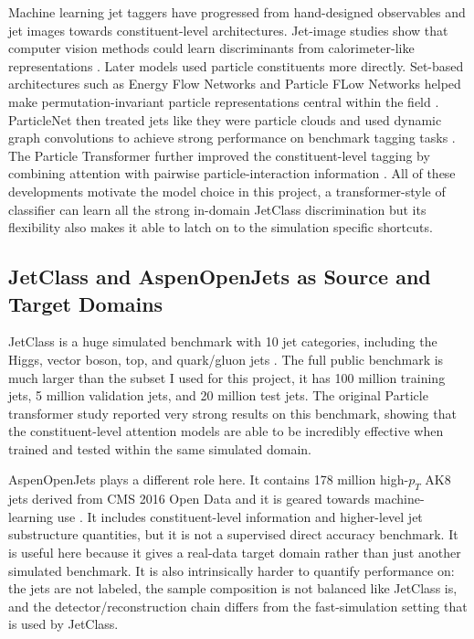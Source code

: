 \documentclass[11pt]{article}
\begin{document}
Machine learning jet taggers have progressed from hand-designed observables and jet images towards constituent-level architectures. Jet-image studies show that computer vision methods could learn discriminants from calorimeter-like representations \cite{cogan2015jetimages,deoliveira2016jetimages}. Later models used particle constituents more directly. Set-based architectures such as Energy Flow Networks and Particle FLow Networks helped make permutation-invariant particle representations central within the field \cite{komiske2019energy}. ParticleNet then treated jets like they were particle clouds and used dynamic graph convolutions to achieve strong performance on benchmark tagging tasks \cite{qu2020particlenet}. The Particle Transformer further improved the constituent-level tagging by combining attention with pairwise particle-interaction information \cite{qu2022particle}. All of these developments motivate the model choice in this project, a transformer-style of classifier can learn all the strong in-domain JetClass discrimination but its flexibility also makes it able to latch on to the simulation specific shortcuts.


\subsection{JetClass and AspenOpenJets as Source and Target Domains}

JetClass is a huge simulated benchmark with 10 jet categories, including the Higgs, vector boson, top, and quark/gluon jets \cite{qu2022particle}. The full public benchmark is much larger than the subset I used for this project, it has 100 million training jets, 5 million validation jets, and 20 million test jets. The original Particle transformer study reported very strong results on this benchmark, showing that the constituent-level attention models are able to be incredibly effective when trained and tested within the same simulated domain.

AspenOpenJets plays a different role here. It contains 178 million  high-$p_T$ AK8 jets derived from CMS 2016 Open Data and it is geared towards machine-learning use \cite{amram2025aspen}. It includes constituent-level information and higher-level jet substructure quantities, but it is not a supervised direct accuracy benchmark. It is useful here because it gives a real-data target domain rather than just another simulated benchmark. It is also intrinsically harder to quantify performance on: the jets are not labeled, the sample composition is not balanced like JetClass is, and the detector/reconstruction chain differs from the fast-simulation setting that is used by JetClass.
\end{document}
